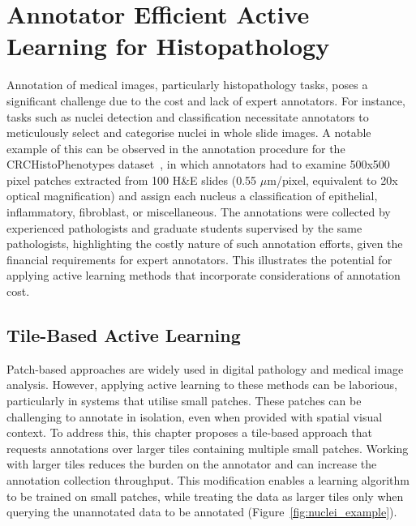 \section{Annotator Efficient Active Learning for Histopathology}
\label{sec:active_annotator_efficient}
Annotation of medical images, particularly histopathology tasks, poses a significant challenge due to the cost and lack of expert annotators. For instance, tasks such as nuclei detection and classification necessitate annotators to meticulously select and categorise nuclei in whole slide images. A notable example of this can be observed in the annotation procedure for the CRCHistoPhenotypes dataset~\citep{sirinukunwattana2016locality}, in which annotators had to examine 500x500 pixel patches extracted from 100 H\&E slides (0.55 $\mu$m/pixel, equivalent to 20x optical magnification) and assign each nucleus a classification of epithelial, inflammatory, fibroblast, or miscellaneous. The annotations were collected by experienced pathologists and graduate students supervised by the same pathologists, highlighting the costly nature of such annotation efforts, given the financial requirements for expert annotators. This illustrates the potential for applying active learning methods that incorporate considerations of annotation cost.

\subsection{Tile-Based Active Learning}
\label{subsec:active_region_based}
Patch-based approaches are widely used in digital pathology and medical image analysis. However, applying active learning to these methods can be laborious, particularly in systems that utilise small patches. These patches can be challenging to annotate in isolation, even when provided with spatial visual context. To address this, this chapter proposes a tile-based approach that requests annotations over larger tiles containing multiple small patches. Working with larger tiles reduces the burden on the annotator and can increase the annotation collection throughput. This modification enables a learning algorithm to be trained on small patches, while treating the data as larger tiles only when querying the unannotated data to be annotated (Figure~\ref{fig:nuclei_example}).

